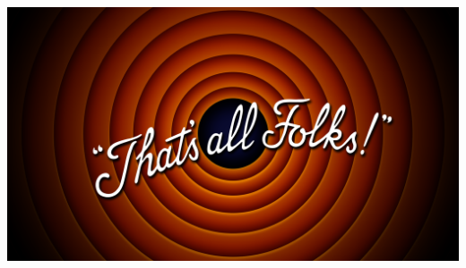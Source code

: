 \documentclass{beamer}
\begin{document}
\begin{frame}
\includegraphics[width = \textwidth]{images/thatsallfolks.png}
\end{frame}
\end{document}
